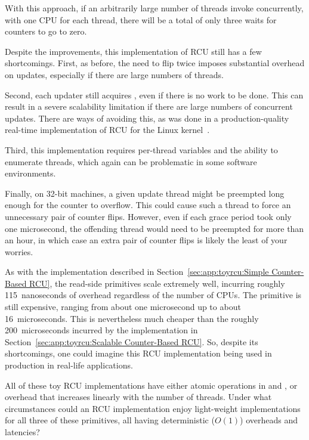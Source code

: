 With this approach, if an arbitrarily large number of threads invoke
 concurrently, with one CPU for each thread, there
will be a total of only three waits for counters to go to zero.

Despite the improvements, this implementation of RCU still
has a few shortcomings.
First, as before, the need to flip  twice imposes substantial
overhead on updates, especially if there are large
numbers of threads.

Second, each updater still acquires , even if there
is no work to be done.
This can result in a severe scalability limitation
if there are large numbers of concurrent updates.
There are ways of avoiding this, as was done in a
production-quality real-time implementation of RCU for the Linux
kernel~\cite{PaulEMcKenney2007PreemptibleRCU}.

Third, this implementation requires per-thread variables
and the ability to enumerate threads, which again can be
problematic in some software environments.

Finally, on 32-bit machines, a given update thread might be
preempted long enough for the 
counter to overflow.
This could cause such a thread to force an unnecessary
pair of counter flips.
However, even if each grace period took only one
microsecond, the offending thread would need to be
preempted for more than an hour, in which case an
extra pair of counter flips is likely the least of
your worries.

As with the implementation described in
Section~\ref{sec:app:toyrcu:Simple Counter-Based RCU},
the read-side primitives scale extremely well, incurring roughly
115~nanoseconds of overhead regardless of the number of CPUs.
The  primitive is still expensive,
ranging from about one microsecond up to about 16~microseconds.
This is nevertheless much cheaper than the roughly 200~microseconds
incurred by the implementation in
Section~\ref{sec:app:toyrcu:Scalable Counter-Based RCU}.
So, despite its shortcomings, one could imagine this
RCU implementation being used in production in real-life applications.

\QuickQuiz{}
	All of these toy RCU implementations have either atomic operations
	in  and ,
	or 
	overhead that increases linearly with the number of threads.
	Under what circumstances could an RCU implementation enjoy
	light-weight implementations for all three of these primitives,
	all having deterministic ($O\left(1\right)$) overheads and latencies?
 \QuickQuizEnd

